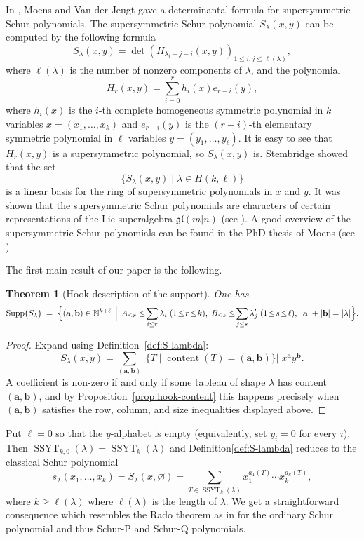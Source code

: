 \documentclass[12pt,a4paper,oneside]{amsart}
\newtheorem{theorem}{Theorem}[section]
\theoremstyle{definition}
\DeclareMathOperator{\Supp}{Supp}
\newcommand{\N}{\mathbb{N}}
\begin{document}
In \cite{MV03}, Moens and Van der Jeugt gave a determinantal formula for supersymmetric Schur polynomials. The supersymmetric Schur polynomial $S_\lambda(x,y)$ can be computed by the following formula
\[S_{\lambda}(x,y) = \det\left(H_{\lambda_{i}+j-i}(x,y)\right)_{1\leq i,j \leq \ell(\lambda)},\]
where $\ell(\lambda)$ is the number of nonzero components of $\lambda$, and the polynomial 
\[H_r(x,y) = \sum_{i = 0}^rh_i(x)e_{r-i}(y),\]
where $h_i(x)$ is the $i$-th complete homogeneous symmetric polynomial in $k$ variables $x=(x_1,\ldots,x_k)$ and $e_{r-i}(y)$ is the $(r-i)$-th elementary symmetric polynomial in $\ell$ variables $y=(y_1,\ldots,y_\ell)$. It is easy to see that $H_r(x,y)$ is a supersymmetric polynomial, so $S_\lambda(x,y)$ is. Stembridge \cite{Ste89} showed that the set 
\[\{S_\lambda(x,y) \mid \lambda \in H(k,\ell)\}\]
is a linear basis for the ring of supersymmetric polynomials in $x$ and $y$. It was shown that the supersymmetric Schur polynomials are characters of certain representations of the Lie superalgebra $\mathfrak{gl}(m|n)$ (see \cite{Kac77}). A good overview of the supersymmetric Schur polynomials can be found in the PhD thesis of Moens (see \cite{Moe07}).

The first main result of our paper is the following.
\begin{theorem}[Hook description of the support]
\label{thm:support-hook}
One has
\[
  \Supp\bigl(S_\lambda\bigr)
  \;=\;
  \Bigl\{(\mathbf a,\mathbf b)\in\N^{k+\ell}\,\Bigm|\,
        A_{\le r}\le\!\sum_{i\le r}\lambda_i\;(1\!\le\! r\!\le\! k),\;
        B_{\le s}\le\!\sum_{j\le s}\lambda'_j\;(1\!\le\! s\!\le\! \ell),\;
        |\mathbf a|+|\mathbf b|=|\lambda|
  \Bigr\}.
\]
\end{theorem}

\begin{proof}
Expand using Definition~\ref{def:S-lambda}:
\[
  S_\lambda(x,y)
     =\sum_{(\mathbf a,\mathbf b)}
        \bigl|\{T\mid\operatorname{content}(T)=(\mathbf a,\mathbf b)\}\bigr|\;
        x^{\mathbf a}y^{\mathbf b}.
\]
A coefficient is non-zero
if and only if some tableau of shape $\lambda$ has content $(\mathbf a,\mathbf b)$,
and by Proposition~\ref{prop:hook-content} this happens precisely when
$(\mathbf a,\mathbf b)$ satisfies the row, column, and size inequalities
displayed above.
\end{proof}

Put \(\ell=0\) so that the \(y\)-alphabet is empty (equivalently, set
\(y_i=0\) for every \(i\)).  Then \(\operatorname{SSYT}_{k,0}(\lambda)=\operatorname{SSYT}_{k}(\lambda)\) and Definition\ref{def:S-lambda} reduces to the classical Schur polynomial
\[
   s_\lambda(x_1,\dots,x_k)
      = S_\lambda(x,\varnothing)
      = \sum_{T\in\operatorname{SSYT}_{k}(\lambda)}
          x_1^{a_1(T)}\cdots x_k^{a_k(T)},
\]
where \(k\ge\ell(\lambda)\) where \(\ell(\lambda)\) is the length of \(\lambda\). We get a straightforward consequence which resembles the Rado theorem as in \cite{MTY19} for the ordinary Schur polynomial and thus Schur-P and Schur-Q polynomials. 
\end{document}
